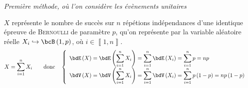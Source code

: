 \documentclass[a4paper,french,bookmarks]{article}
\begin{document}
\begin{enumerate}
\begin{nproof}
            \begin{center}
                \itshape\EBGaramond\large Première méthode, où l'on considère les évènements
                unitaires
            \end{center}
            $X$ représente le nombre de succès sur $n$ répétions indépendances d'une identique
            épreuve de \textsc{Bernoulli} de paramètre $p$, qu'on représente par la variable
            aléatoire réelle $X_i \hookrightarrow \bcB\left(1, p\right)$, où
            $i \in \left\llbracket 1, n\right\rrbracket$.
            \[ X = \sum_{i = 1}^n X_i \qquad\text{donc}\quad \left\lbrace\begin{array}{l}
                \displaystyle \bdE\left(X\right) = \bdE\left(\sum_{i = 1}^n X_i\right) =
                \sum_{i = 1}^n \bdE\left(X_i\right) = \sum_{i=1}^n p = np\\[5pt]
                \displaystyle \bdV\left(X\right) = \bdV\left(\sum_{i = 1}^n X_i\right)
                = \sum_{i = 1}^n \bdV\left(X_i\right) = \sum_{i=1}^n p\left(1-p\right) =
                np\left(1-p\right)
            \end{array}\right.\]
            \text{}\medskip
            

\end{nproof}
\end{enumerate}
\end{document}
